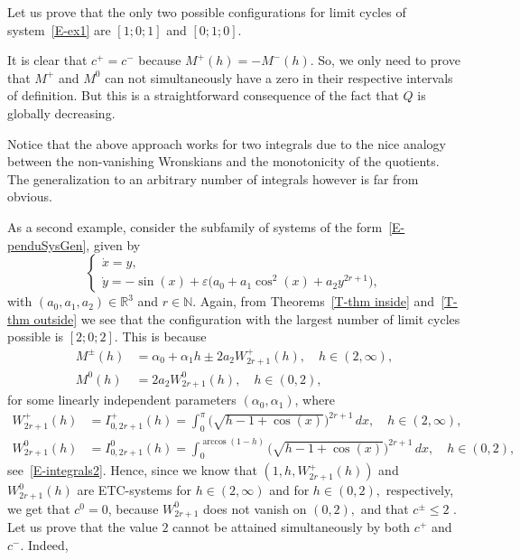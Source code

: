 \documentclass[12pt,psamsfonts]{amsart}
\begin{document}
Let us prove that the only two possible configurations for limit cycles of system~\eqref{E-ex1} are
$[1;0;1]$ and $[0;1;0]$.

It is clear that $c^+=c^-$ because $M^+(h)=-M^-(h).$ So, we only need to prove that $M^+$ and
$M^0$ can not  simultaneously have a zero in their respective intervals of definition. But this is a
straightforward consequence of the fact that $Q$ is globally decreasing.

Notice that the above  approach works for two integrals due to the nice analogy between the
non-vanishing Wronskians and the monotonicity of the quotients. The generalization to an arbitrary
number of integrals however is far from obvious.

As a second example, consider   the subfamily of systems of the form~\eqref{E-penduSysGen}, given by
\begin{equation}
      \label{E-ex2}
           {
  \left\{\!
   \begin{array}{l}
    \dot x={y,} \\[2pt] \dot y={-\sin( x)+ {\varepsilon} \big(a_0+a_1\cos^2(x)+ a_2 y^{2r+1}\big),}
   \end{array}
  \right.
}
     \end{equation}
with $(a_0,a_1,a_2)\in{\mathbb{R}}^3$ and $r\in{\mathbb{N}}.$ Again, from Theorems~\ref{T-thm inside} and~\ref{T-thm outside} we see that the configuration
with the largest number of  limit cycles possible is $[2;0;2]$. This is because
\begin{align*}
M^{\pm} (h)&=  \alpha_0+\alpha_1 h \pm 2 a_2 W_{2r+1}^+(h)  ,\quad h\in(2,\infty),\\
  M^{0} (h)&=2 a_2 W_{2r+1}^0(h) ,\quad h\in(0,2),
  \end{align*}
for some linearly independent parameters $(\alpha_0,\alpha_1)$, where
\begin{align*}
W_{2r+1}^+(h)&=I_{0,2r+1}^+(h)= \int_0^\pi \big(\sqrt{h-1+\cos(x)}\big)^{2r+1}\,dx,
\quad h\in(2,\infty),\\
W_{2r+1}^0(h)&=I_{0,2r+1}^0(h)= \int_0^{\arccos(1-h)}\big(\sqrt{h-1+\cos(x)}\big)^{2r+1}\,dx, \quad
h\in(0,2),
\end{align*} see~\eqref{E-integrals2}. Hence, since  we know that $(1,h,W_{2r+1}^+(h))$ and
$W_{2r+1}^0(h)$ are ETC-systems for $h\in(2,\infty)$ and for $h\in(0,2),$ respectively, we get
that $c^0=0$, because $W_{2r+1}^0$ does not vanish on $(0,2),$ and that $c^\pm\leq 2$ . Let us
prove that the value $2$ cannot be attained simultaneously by both $c^+$ and $c^-$. Indeed,
\end{document}
